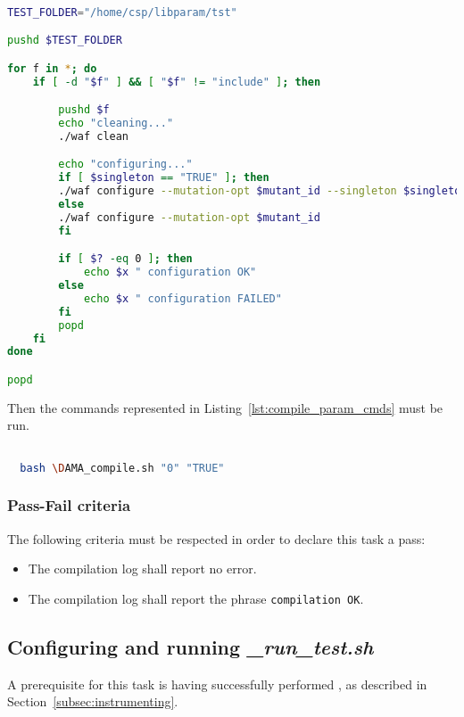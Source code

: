 \begin{lstlisting}[language=bash, label={lst:compile_param}]

TEST_FOLDER="/home/csp/libparam/tst"

pushd $TEST_FOLDER

for f in *; do
    if [ -d "$f" ] && [ "$f" != "include" ]; then

        pushd $f
        echo "cleaning..."
        ./waf clean

        echo "configuring..."
        if [ $singleton == "TRUE" ]; then
        ./waf configure --mutation-opt $mutant_id --singleton $singleton
        else
        ./waf configure --mutation-opt $mutant_id
        fi

        if [ $? -eq 0 ]; then
            echo $x " configuration OK"
        else
            echo $x " configuration FAILED"
        fi
        popd
    fi
done

popd

\end{lstlisting}

Then the commands represented in Listing~\ref{lst:compile_param_cmds} must be run.

  \begin{lstlisting}[language=bash, label={lst:compile_param_cmds}]

  bash \DAMA_compile.sh "0" "TRUE"

  \end{lstlisting}

\subsubsection{Pass-Fail criteria}

The following criteria must be respected in order to declare this task a pass:
\begin{itemize}
  \item The compilation log shall report no error.
  \item The compilation log shall report the phrase \texttt{compilation OK}.
\end{itemize}


\subsection{Configuring and running \emph{\DAMA\_run\_test.sh}}

A prerequisite for this task is having successfully performed , as described in Section~\ref{subsec:instrumenting}.

